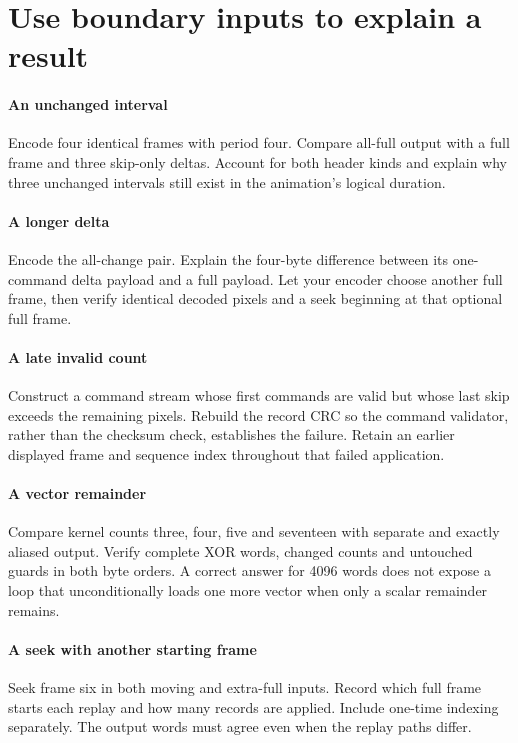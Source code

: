 \section{Use boundary inputs to explain a result}
\paragraph{An unchanged interval}
Encode four identical frames with period four. Compare all-full output with a full
frame and three skip-only deltas. Account for both header kinds and explain why
three unchanged intervals still exist in the animation's logical duration.

\paragraph{A longer delta}
Encode the all-change pair. Explain the four-byte difference between its one-command
delta payload and a full payload. Let your encoder choose another full frame, then
verify identical decoded pixels and a seek beginning at that optional full frame.

\paragraph{A late invalid count}
Construct a command stream whose first commands are valid but whose last skip exceeds
the remaining pixels. Rebuild the record CRC so the command validator, rather than
the checksum check, establishes the failure. Retain an earlier displayed frame and
sequence index throughout that failed application.

\paragraph{A vector remainder}
Compare kernel counts three, four, five and seventeen with separate and exactly
aliased output. Verify complete XOR words, changed counts and untouched guards in
both byte orders. A correct answer for 4096 words does not expose a loop that
unconditionally loads one more vector when only a scalar remainder remains.

\paragraph{A seek with another starting frame}
Seek frame six in both moving and extra-full inputs. Record which full frame starts
each replay and how many records are applied. Include one-time indexing separately.
The output words must agree even when the replay paths differ.
